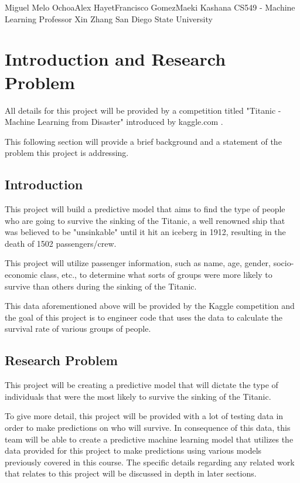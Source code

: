 \documentclass{IEEE}
\begin{document}
{Miguel Melo Ochoa}{Alex Hayet}{Francisco Gomez}{Maeki Kashana}
{CS549 - Machine Learning}
{Professor Xin Zhang}
{San Diego State University}


\section{Introduction and Research Problem}
All details for this project will be provided by a competition titled "Titanic - Machine Learning from Disaster" introduced by kaggle.com \cite{titanic}.

This following section will provide a brief background and a statement of the problem this project is addressing.




\subsection{Introduction}

This project will build a predictive model that aims to find the type of people who are going to survive the sinking of the Titanic, a well renowned ship that was believed to be "unsinkable" until it hit an iceberg in 1912, resulting in the death of 1502 passengers/crew.

This project will utilize passenger information, such as name, age, gender, socio-economic class, etc., to determine what sorts of groups were more likely to survive than others during the sinking of the Titanic.

This data aforementioned above will be provided by the Kaggle competition and the goal of this project is to engineer code that uses the data to calculate the survival rate of various groups of people.

\subsection{Research Problem}

This project will be creating a predictive model that will dictate the type of individuals that were the most likely to survive the sinking of the Titanic.

To give more detail, this project will be provided with a lot of testing data in order to make predictions on who will survive. In consequence of this data, this team will be able to create a predictive machine learning model that utilizes the data provided for this project to make predictions using various models previously covered in this course. The specific details regarding any related work that relates to this project will be discussed in depth in later sections.
\end{document}
